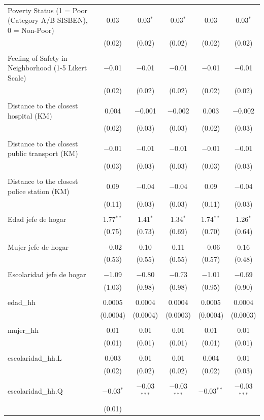 \begin{table}[H]
\begin{tabularx}{0.9\textwidth}{@{\extracolsep{-7pt}}lccccc}
 Poverty Status (1 = Poor (Category A/B SISBEN), 0 = Non-Poor) & 0.03 & 0.03$^{*}$ & 0.03$^{*}$ & 0.03 & 0.03$^{*}$ \\    & (0.02) & (0.02) & (0.02) & (0.02) & (0.02) \\    & & & & & \\   Feeling of Safety in Neighborhood (1-5 Likert Scale) & $-$0.01 & $-$0.01 & $-$0.01 & $-$0.01 & $-$0.01 \\    & (0.02) & (0.02) & (0.02) & (0.02) & (0.02) \\    & & & & & \\   Distance to the closest hospital (KM) & 0.004 & $-$0.001 & $-$0.002 & 0.003 & $-$0.002 \\    & (0.02) & (0.03) & (0.03) & (0.02) & (0.03) \\    & & & & & \\   Distance to the closest public transport  (KM) & $-$0.01 & $-$0.01 & $-$0.01 & $-$0.01 & $-$0.01 \\    & (0.03) & (0.03) & (0.03) & (0.03) & (0.03) \\    & & & & & \\   Distance to the closest police station (KM) & 0.09 & $-$0.04 & $-$0.04 & 0.09 & $-$0.04 \\    & (0.11) & (0.03) & (0.03) & (0.11) & (0.03) \\    & & & & & \\   Edad jefe de hogar & 1.77$^{**}$ & 1.41$^{*}$ & 1.34$^{*}$ & 1.74$^{**}$ & 1.26$^{*}$ \\    & (0.75) & (0.73) & (0.69) & (0.70) & (0.64) \\    & & & & & \\   Mujer jefe de hogar & $-$0.02 & 0.10 & 0.11 & $-$0.06 & 0.16 \\    & (0.53) & (0.55) & (0.55) & (0.57) & (0.48) \\    & & & & & \\   Escolaridad jefe de hogar & $-$1.09 & $-$0.80 & $-$0.73 & $-$1.01 & $-$0.69 \\    & (1.03) & (0.98) & (0.98) & (0.95) & (0.90) \\    & & & & & \\   edad\_hh & 0.0005 & 0.0004 & 0.0004 & 0.0005 & 0.0004 \\    & (0.0004) & (0.0004) & (0.0003) & (0.0004) & (0.0003) \\    & & & & & \\   mujer\_hh & 0.01 & 0.01 & 0.01 & 0.01 & 0.01 \\    & (0.01) & (0.01) & (0.01) & (0.01) & (0.01) \\    & & & & & \\   escolaridad\_hh.L & 0.003 & 0.01 & 0.01 & 0.004 & 0.01 \\    & (0.02) & (0.02) & (0.02) & (0.02) & (0.03) \\    & & & & & \\   escolaridad\_hh.Q & $-$0.03$^{*}$ & $-$0.03$^{***}$ & $-$0.03$^{***}$ & $-$0.03$^{**}$ & $-$0.03$^{***}$ \\    & (0.01) 
\end{tabularx}
\end{table}
